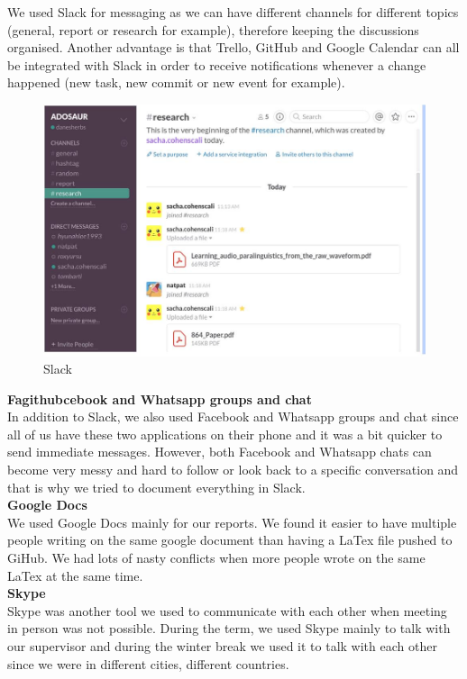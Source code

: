 \documentclass{article}
\begin{document}
We used Slack for messaging as we can have different channels for different topics (general, report or research for example), therefore keeping the discussions organised. Another advantage is that Trello, GitHub and Google Calendar can all be integrated with Slack in order to receive notifications whenever a change happened (new task, new commit or new event for example).\\
\begin{figure}[H]

\centering

\includegraphics[scale=0.6]{slack}
\caption{Slack}
\end{figure}

\textbf{Fagithubcebook\cite{facebook} and Whatsapp \cite{whatsapp} groups and chat}\\
In addition to Slack, we also used Facebook and Whatsapp groups and chat since all of us have these two applications on their phone and it was a bit quicker to send immediate messages. However, both Facebook and Whatsapp chats can become very messy and hard to follow or look back to a specific conversation and that is why we tried to document everything in Slack.\\

\textbf{Google Docs \cite{googledocs}}\\
We used Google Docs mainly for our reports. We found it easier to have multiple people writing on the same google document than having a LaTex file pushed to GiHub. We had lots of nasty conflicts when more people wrote on the same LaTex at the same time. \\

\textbf{Skype \cite{skype} }\\
Skype was another tool we used to communicate with each other when meeting in person was not possible. During the term, we used Skype mainly to talk with our supervisor and during the winter break we used it to talk with each other since we were in different cities, different countries. \\
\end{document}

